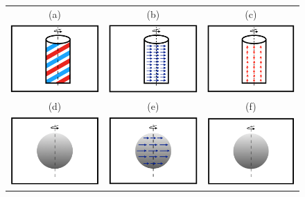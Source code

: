 \documentclass[letterpaper,11pt]{article}
\begin{document}
\begin{figure}[hbt!]
	\centering
	\begin{tabular}{ccc} 
		(a) & (b) & (c)\\
		\includegraphics[width=.3\textwidth]{grf/barber-pole.png} &
		\includegraphics[width=.3\textwidth]{grf/barber-pole-motion-field.png} &
		\includegraphics[width=.3\textwidth]{grf/barber-pole-optical-flow.png}
		\vspace{0.5cm}\\ 
		(d) & (e) & (f) \\
		\includegraphics[width=.3\textwidth]{grf/lambertian-sphere.png} &
		\includegraphics[width=.3\textwidth]{grf/lambertian-sphere-motion-field.png} &
		\includegraphics[width=.3\textwidth]{grf/lambertian-sphere-optical-flow.png}

\end{tabular}
\end{figure}
\end{document}

